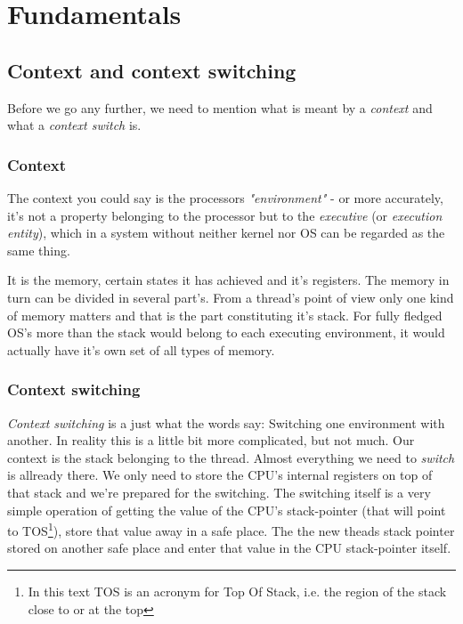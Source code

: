 \chapter{Fundamentals}

	\section{Context and context switching}
		Before we go any further, we need to mention what is meant by a \textit{context} and what a \textit{context switch} is.
	
		\subsection{Context}
			The context you could say is the processors \textit{"environment"} - or more accurately, it's not a property belonging to the processor but to the \textit{executive} (or \textit{execution entity}), which in a system without neither kernel nor OS can be regarded as the same thing. 

			It is the memory, certain states it has achieved and it's registers. The memory in turn can be divided in several part's. From a thread's point of view only one kind of memory matters and that is the part constituting it's stack. For fully fledged OS's more than the stack would belong to each executing environment, it would actually have it's own set of all types of memory.
	
		\subsection{Context switching}
			\textit{Context switching} is a just what the words say: Switching one environment with another. In reality this is a little bit more complicated, but not much. Our context is the stack belonging to the thread. Almost everything we need to \textit{switch} is allready there. We only need to store the CPU's internal registers on top of that stack and we're prepared for the switching. The switching itself is a very simple operation of getting the value of the CPU's stack-pointer (that will point to TOS\footnote{In this text TOS is an acronym for Top Of Stack, i.e. the region of the stack close to or at the top}), store that value away in a safe place. The the new theads stack pointer stored on another safe place and enter that value in the CPU stack-pointer itself.

